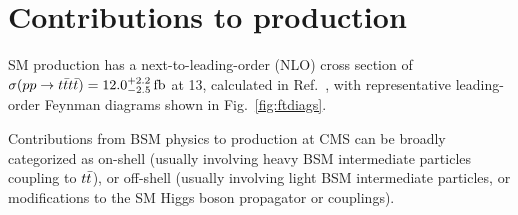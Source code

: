 
\FloatBarrier

\section{Contributions to \tttt production}

SM \tttt production has a next-to-leading-order (NLO) cross section of 
$\sigma(pp\to t\bar{t}t\bar{t}) = 12.0^{+2.2}_{-2.5}\text{\,fb}$
at 13\TeV, calculated in Ref.~\cite{THEORY:Frederix2017wme},
with representative leading-order Feynman diagrams shown in
Fig.~\ref{fig:ftdiags}.

Contributions from BSM physics to \tttt production at CMS can be 
broadly categorized as on-shell (usually involving heavy BSM intermediate particles coupling
to $t\bar{t}$), or off-shell (usually involving light BSM intermediate particles, or
modifications to the SM Higgs boson propagator or couplings).

